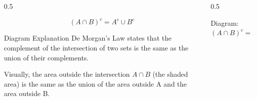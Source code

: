 \begin{frame}
    \frametitle{\ }
    \vspace{-9mm}
    \begin{columns}[T]
        \begin{column}{0.5\textwidth}
            \begin{Teorema}
                \[ (A \cap B)^c = A^c \cup B^c \]
            \end{Teorema}
            
            \begin{block}{Diagram Explanation}
                De Morgan's Law states that the complement of the intersection of two sets is the same as the union of their complements.
                \vspace{0.5cm}
                
                Visually, the area outside the intersection \(A \cap B\) (the shaded area) is the same as the union of the area outside A and the area outside B.
            \end{block}
        \end{column}
        
        \begin{column}{0.5\textwidth}
            \begin{block}{Diagram: \((A \cap B)^c = A^c \cup B^c\)}
                \centering
            \end{block}
        \end{column}
    \end{columns}
\end{frame}

